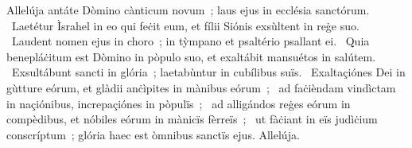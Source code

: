 { Allelúja}
{%
antáte Dòmino cànticum novum~; laus ejus in ecclésia sanctórum. 
~Laetétur Ìsrahel in eo qui feċit eum, et fílii Siónis exsùltent in reġe suo. 
~Laudent nomen ejus in choro~; in tỳmpano et psaltério psallant ei. 
~Quia benepláċitum est Dòmino in pòpulo suo, et exaltábit mansuétos in salútem. 
~Exsultábunt sancti in glória~; laetabùntur in cubílibus suïs. 
~Exaltaçiónes Dei in gùtture eórum, et glàdii anċìpites in mànibus eórum~; 
~ad faċièndam vindìctam in naçiónibus, increpaçiónes in pòpulïs~; 
~ad alligándos reġes eórum in compèdibus, et nóbiles eórum in mànicïs fèrreïs~; 
~ut fàċiant in eïs judìċium conscríptum~; glória haec est òmnibus sanctïs ejus. Allelúja. 
}
